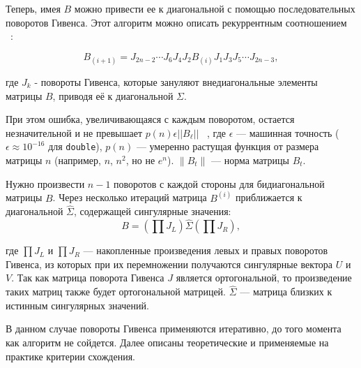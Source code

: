 Теперь, имея $B$ можно привести ее к диагональной с помощью последовательных поворотов Гивенса. Этот алгоритм можно описать рекуррентным соотношением ~\cite{Demmel1990}:

\begin{equation}
B_{(i+1)} = J_{2n-2} \cdots J_6 J_4 J_2 B_{(i)} J_1 J_3 J_5 \cdots J_{2n-3},
\end{equation}

где \( J_k \) - повороты Гивенса, которые зануляют внедиагональные элементы матрицы \( B \), приводя её к диагональной \( \Sigma \). 

При этом ошибка, увеличивающаяся с каждым поворотом, остается незначительной и не превышает $p(n) \epsilon ||B_\ell||$ ~\cite{Demmel1990}, где  \( \epsilon \) — машинная точность (\( \epsilon \approx 10^{-16} \) для \texttt{double}), \( p(n) \) — умеренно растущая функция от размера матрицы \( n \) (например, \( n \), \( n^2 \), но не \( e^n \)). \( \|B_t\| \) — норма матрицы \( B_t \).

Нужно произвести \( n-1 \) поворотов с каждой стороны для бидиагональной матрицы \( B \). Через несколько итераций матрица \( B^{(i)} \) приближается к диагональной \( \widehat{\Sigma} \), содержащей сингулярные значения:
\begin{equation}
B = \left( \prod J_L \right) \widehat{\Sigma} \left( \prod J_R \right),
\end{equation}

где \( \prod J_L \) и \( \prod J_R \) — накопленные произведения левых и правых поворотов Гивенса, из которых при их перемножении получаются сингулярные вектора \( U \) и \( V \). Так как матрица поворота Гивенса $J$ является ортогональной, то произведение таких матриц также будет ортогональной матрицей.  $\widehat{\Sigma}$ — матрица близких к истинным сингулярных значений.

В данном случае повороты Гивенса применяются итеративно, до того момента как алгоритм не сойдется. Далее описаны теоретические и применяемые на практике критерии схождения.


